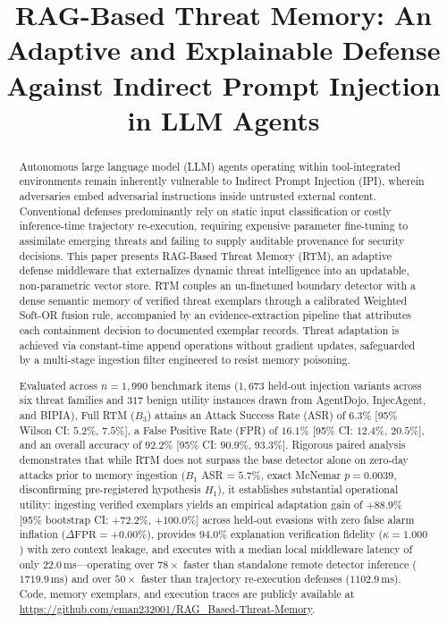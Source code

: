 \documentclass[conference]{IEEEtran}
\begin{document}
\title{RAG-Based Threat Memory: An Adaptive and Explainable Defense Against Indirect Prompt Injection in LLM Agents}

\author{
}

\maketitle

\begin{abstract}
Autonomous large language model (LLM) agents operating within tool-integrated environments remain inherently vulnerable to Indirect Prompt Injection (IPI), wherein adversaries embed adversarial instructions inside untrusted external content. Conventional defenses predominantly rely on static input classification or costly inference-time trajectory re-execution, requiring expensive parameter fine-tuning to assimilate emerging threats and failing to supply auditable provenance for security decisions. This paper presents RAG-Based Threat Memory (RTM), an adaptive defense middleware that externalizes dynamic threat intelligence into an updatable, non-parametric vector store. RTM couples an un-finetuned boundary detector with a dense semantic memory of verified threat exemplars through a calibrated Weighted Soft-OR fusion rule, accompanied by an evidence-extraction pipeline that attributes each containment decision to documented exemplar records. Threat adaptation is achieved via constant-time append operations without gradient updates, safeguarded by a multi-stage ingestion filter engineered to resist memory poisoning. 

Evaluated across $n = 1,990$ benchmark items ($1,673$ held-out injection variants across six threat families and $317$ benign utility instances drawn from AgentDojo, InjecAgent, and BIPIA), Full RTM ($B_3$) attains an Attack Success Rate (ASR) of $6.3\%$ [95\% Wilson CI: $5.2\%$, $7.5\%$], a False Positive Rate (FPR) of $16.1\%$ [95\% CI: $12.4\%$, $20.5\%$], and an overall accuracy of $92.2\%$ [95\% CI: $90.9\%$, $93.3\%$]. Rigorous paired analysis demonstrates that while RTM does not surpass the base detector alone on zero-day attacks prior to memory ingestion ($B_1$ ASR = $5.7\%$, exact McNemar $p = 0.0039$, disconfirming pre-registered hypothesis $H_1$), it establishes substantial operational utility: ingesting verified exemplars yields an empirical adaptation gain of $+88.9\%$ [95\% bootstrap CI: $+72.2\%$, $+100.0\%$] across held-out evasions with zero false alarm inflation ($\Delta\text{FPR} = +0.00\%$), provides $94.0\%$ explanation verification fidelity ($\kappa = 1.000$) with zero context leakage, and executes with a median local middleware latency of only $22.0$\,ms---operating over $78\times$ faster than standalone remote detector inference ($1719.9$\,ms) and over $50\times$ faster than trajectory re-execution defenses ($1102.9$\,ms). Code, memory exemplars, and execution traces are publicly available at \url{https://github.com/eman232001/RAG_Based-Threat-Memory}.
\end{abstract}
\end{document}
